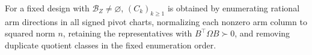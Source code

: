 For a fixed design with \(\mathcal B_Z\ne\varnothing\), \((C_k)_{k\ge1}\) is obtained by enumerating rational arm directions in all signed pivot charts, normalizing each nonzero arm column to squared norm \(n\), retaining the representatives with \(B^{\top}\Omega B\succ0\), and removing duplicate quotient classes in the fixed enumeration order.